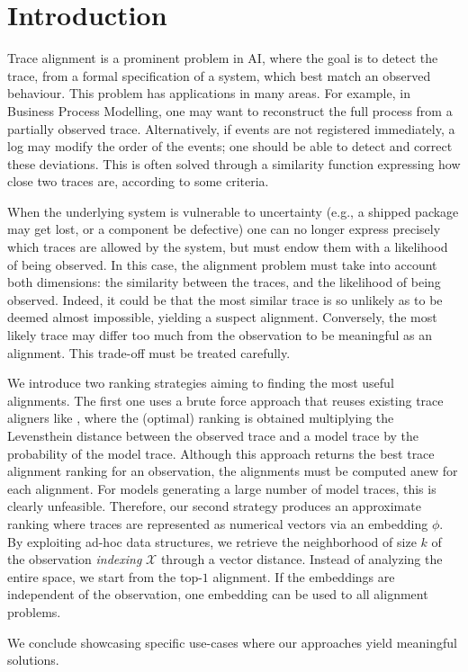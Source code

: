 
\section{Introduction}
\label{introduction}

Trace alignment is a prominent problem in AI, where the goal is to detect the trace, from a formal specification of a system,
which best match an observed behaviour. This problem has applications in many areas. For example, in Business Process Modelling, 
one may want to reconstruct the full process from a partially observed trace. Alternatively, if events are not registered immediately,
a log may modify the order of the events; one should be able to detect and correct these deviations. This is often solved 
through a similarity function expressing how close two traces are, according to some criteria.

When the underlying system is vulnerable to uncertainty (e.g., a shipped package may get lost, or a component be defective)
one can no longer express precisely which traces are allowed by the system, but must endow them with a likelihood
of being observed. In this case, the alignment problem must take into account both dimensions: the similarity between the
traces, and the likelihood of being observed. Indeed, it could be that the most similar trace is so unlikely as to be deemed almost
impossible, yielding a suspect alignment. Conversely, the most likely trace may differ too much from the observation to be
meaningful as an alignment. This trade-off must be treated carefully.

We introduce two ranking strategies aiming to finding the most useful alignments. The first one uses a brute force approach that 
reuses existing trace aligners like \cite{DBLP:conf/edoc/AdriansyahDA11,LeoniM17}, where the (optimal) ranking 
is obtained multiplying the Levensthein distance between the observed trace and a model trace by the probability of the 
model trace. Although this approach returns the best trace alignment ranking for an observation, the alignments must be computed 
anew for each alignment. For models generating a large number of model traces, this is clearly unfeasible. Therefore, our second 
strategy produces an approximate ranking where traces are represented as numerical vectors via an embedding $\phi$. 
By exploiting ad-hoc data structures, we retrieve the neighborhood of size $k$ of the observation \textit{indexing} $\mathcal{X}$ 
through a vector distance. Instead of analyzing the entire space, we start from the top-$1$ alignment. If the embeddings are 
independent of the observation, one embedding can be used to all alignment problems.

We conclude showcasing specific use-cases where our approaches yield meaningful solutions. 
